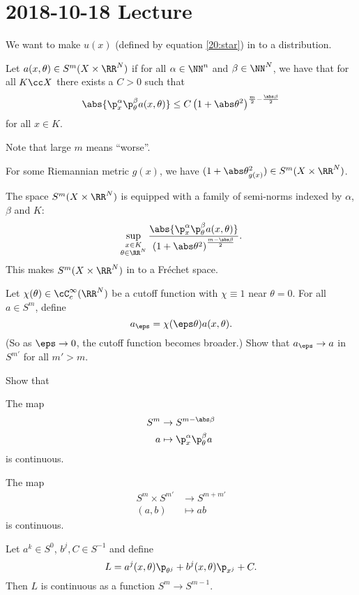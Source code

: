 \section{2018-10-18 Lecture}

We want to make $u(x)$ (defined by equation \ref{20:star}) in to a distribution.

\begin{defn}
  Let $a(x,\theta)\in S^m(X\times\RR^N)$ if for all $\alpha\in\NN^n$ and $\beta\in\NN^N$, we have that for all $K\cc X$ there exists a $C>0$ such that 
  \[ \abs{\p_x^\alpha\p_\theta^\beta a(x,\theta)} \leq C\left( 1+\abs\theta^2 \right)^{\frac m2-\frac{\abs\beta}2} \]
  for all $x\in K$.
\end{defn}

Note that large $m$ means ``worse''.

\begin{exam}
  For some Riemannian metric $g(x)$, we have $(1+\abs\theta^2_{g(x)}) \in S^m(X\times\RR^N)$.
\end{exam}

The space $S^m(X\times\RR^N)$ is equipped with a family of semi-norms indexed by $\alpha$, $\beta$ and $K$:
\[ \sup_{\substack{x\in K \\ \theta\in\RR^N}} \frac{\abs{\p_x^\alpha\p_\theta^\beta a(x,\theta)}}{\left( 1+\abs\theta^2 \right)^\frac{m-\abs\beta}2}. \]
This makes $S^m(X\times\RR^N)$ in to a Fr\'echet space.

\begin{exer}
  Let $\chi(\theta)\in\cC_c^\infty(\RR^N)$ be a cutoff function with $\chi\equiv1$ near $\theta=0$.
  For all $a\in S^m$, define
  \[ a_\eps=\chi(\eps\theta)a(x,\theta). \]
  (So as $\eps\to0$, the cutoff function becomes broader.)
  Show that $a_\eps\to a$ in $S^{m'}$ for all $m'>m$.
\end{exer}

\begin{exer}
  Show that
  \begin{enum}
    \io The map
    \begin{align*}
      S^m &\to S^{m-\abs\beta} \\
      a&\mapsto\p_x^\alpha\p_\theta^\beta a \end{align*} is continuous. 
    
    \io The map
    \begin{align*}
      S^m\times S^{m'} &\to S^{m+m'} \\
      (a,b)&\mapsto ab
    \end{align*}
    is continuous.

    \io Let $a^k\in S^0$, $b^j,C\in S^{-1}$ and define
    \[ L = a^j(x,\theta)\p_{\theta^j} + b^j(x,\theta)\p_{x^j} + C. \]
    Then $L$ is continuous as a function $S^m \to S^{m-1}$.
  \end{enum}
\end{exer}

